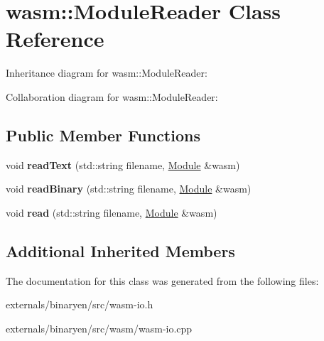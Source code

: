 \hypertarget{classwasm_1_1_module_reader}{}\section{wasm\+:\+:Module\+Reader Class Reference}
\label{classwasm_1_1_module_reader}


Inheritance diagram for wasm\+:\+:Module\+Reader\+:


Collaboration diagram for wasm\+:\+:Module\+Reader\+:
\subsection*{Public Member Functions}
\begin{DoxyCompactItemize}
\item 
\mbox{\label{classwasm_1_1_module_reader_aca93ce23b8c9fd09a309c2ef93b46b70}} 
void {\bfseries read\+Text} (std\+::string filename, \mbox{\hyperlink{classwasm_1_1_module}{Module}} \&wasm)
\item 
\mbox{\label{classwasm_1_1_module_reader_ab9973cb8817387e139b3c5fd4b50d859}} 
void {\bfseries read\+Binary} (std\+::string filename, \mbox{\hyperlink{classwasm_1_1_module}{Module}} \&wasm)
\item 
\mbox{\label{classwasm_1_1_module_reader_a264d690fbe7cd3826a65d849744338b9}} 
void {\bfseries read} (std\+::string filename, \mbox{\hyperlink{classwasm_1_1_module}{Module}} \&wasm)
\end{DoxyCompactItemize}
\subsection*{Additional Inherited Members}


The documentation for this class was generated from the following files\+:\begin{DoxyCompactItemize}
\item 
externals/binaryen/src/wasm-\/io.\+h\item 
externals/binaryen/src/wasm/wasm-\/io.\+cpp\end{DoxyCompactItemize}
